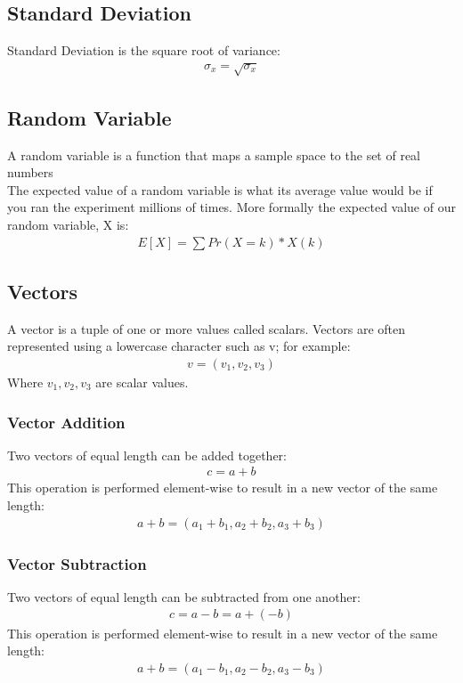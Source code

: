 \documentclass{article}
\begin{document}
\subsection{Standard Deviation}
Standard Deviation is the square root of variance:\\
\begin{align*}
\sigma_x = \sqrt{\sigma_x}
\end{align*}

\subsection{Random Variable}
A random variable is a function that maps a sample space to the set of real numbers\\
The expected value of a random variable is what its average value would be if you ran the experiment millions of times. More formally the expected value of our random variable, X is:\\
\begin{align*}
E[X] = \sum{Pr(X=k) * X(k)}
\end{align*}

\subsection{Vectors}
A vector is a tuple of one or more values called scalars. Vectors are often represented using a lowercase character such as v; for example:
\begin{align*}
v = (v_1, v_2, v_3)
\end{align*}
Where $v_1, v_2, v_3$ are scalar values.

\subsubsection{Vector Addition}
Two vectors of equal length can be added together:
\begin{align*}
c = a + b
\end{align*}
This operation is performed element-wise to result in a new vector of the same length:
\begin{align*}
a + b = (a_1 + b_1, a_2 + b_2, a_3 + b_3)
\end{align*}

\subsubsection{Vector Subtraction}
Two vectors of equal length can be subtracted from one another:
\begin{align*}
c = a - b = a + (-b)
\end{align*}
This operation is performed element-wise to result in a new vector of the same length:
\begin{align*}
a + b = (a_1 - b_1, a_2 - b_2, a_3 - b_3)
\end{align*}
\end{document}
